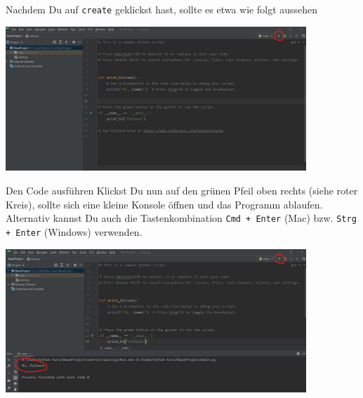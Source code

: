 \begin{frame}

\begin{block}{Nachdem Du auf \texttt{create} geklickst hast, sollte es etwa wie folgt aussehen}
\vspace{2pt}
	\begin{center}
		\includegraphics[width=0.85\textwidth]{pycharm_skript.jpg}
	\end{center}	



\end{block}

\end{frame}


\begin{frame}

\begin{block}{Den Code ausführen}
\vspace{2pt}
Klickst Du nun auf den grünen Pfeil oben rechts (siehe roter Kreis), sollte sich eine kleine Konsole öffnen und das Programm ablaufen. 
Alternativ kannst Du auch die Tastenkombination \texttt{Cmd + Enter} (Mac) bzw. \texttt{Strg + Enter} (Windows) verwenden.  

\pause

\begin{center}
	\includegraphics[width=0.85\textwidth]{pycharm_run.jpg}
\end{center}	

\end{block}

\end{frame}


